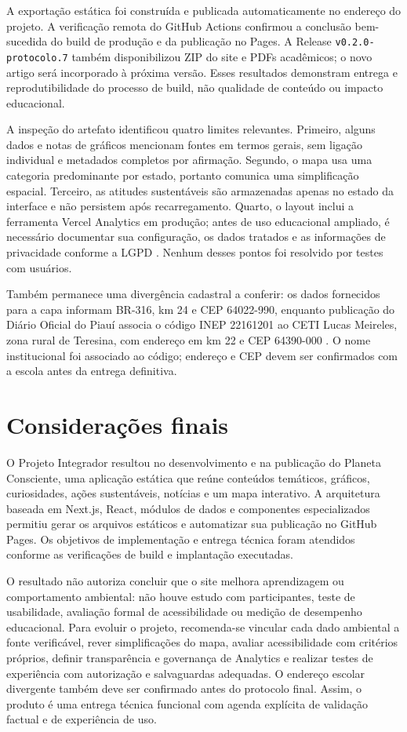 \documentclass[12pt,oneside,a4paper,brazil]{abntex2}
\begin{document}
A exportação estática foi construída e publicada automaticamente no endereço do projeto. A verificação remota do GitHub Actions confirmou a conclusão bem-sucedida do build de produção e da publicação no Pages. A Release \texttt{v0.2.0-protocolo.7} também disponibilizou ZIP do site e PDFs acadêmicos; o novo artigo será incorporado à próxima versão. Esses resultados demonstram entrega e reprodutibilidade do processo de build, não qualidade de conteúdo ou impacto educacional.

A inspeção do artefato identificou quatro limites relevantes. Primeiro, alguns dados e notas de gráficos mencionam fontes em termos gerais, sem ligação individual e metadados completos por afirmação. Segundo, o mapa usa uma categoria predominante por estado, portanto comunica uma simplificação espacial. Terceiro, as atitudes sustentáveis são armazenadas apenas no estado da interface e não persistem após recarregamento. Quarto, o layout inclui a ferramenta Vercel Analytics em produção; antes de uso educacional ampliado, é necessário documentar sua configuração, os dados tratados e as informações de privacidade conforme a LGPD \cite{lgpd}. Nenhum desses pontos foi resolvido por testes com usuários.

Também permanece uma divergência cadastral a conferir: os dados fornecidos para a capa informam BR-316, km 24 e CEP 64022-990, enquanto publicação do Diário Oficial do Piauí associa o código INEP 22161201 ao CETI Lucas Meireles, zona rural de Teresina, com endereço em km 22 e CEP 64390-000 \cite{doepi2025}. O nome institucional foi associado ao código; endereço e CEP devem ser confirmados com a escola antes da entrega definitiva.


\chapter{Considerações finais}
O Projeto Integrador resultou no desenvolvimento e na publicação do Planeta Consciente, uma aplicação estática que reúne conteúdos temáticos, gráficos, curiosidades, ações sustentáveis, notícias e um mapa interativo. A arquitetura baseada em Next.js, React, módulos de dados e componentes especializados permitiu gerar os arquivos estáticos e automatizar sua publicação no GitHub Pages. Os objetivos de implementação e entrega técnica foram atendidos conforme as verificações de build e implantação executadas.

O resultado não autoriza concluir que o site melhora aprendizagem ou comportamento ambiental: não houve estudo com participantes, teste de usabilidade, avaliação formal de acessibilidade ou medição de desempenho educacional. Para evoluir o projeto, recomenda-se vincular cada dado ambiental a fonte verificável, rever simplificações do mapa, avaliar acessibilidade com critérios próprios, definir transparência e governança de Analytics e realizar testes de experiência com autorização e salvaguardas adequadas. O endereço escolar divergente também deve ser confirmado antes do protocolo final. Assim, o produto é uma entrega técnica funcional com agenda explícita de validação factual e de experiência de uso.
\end{document}
